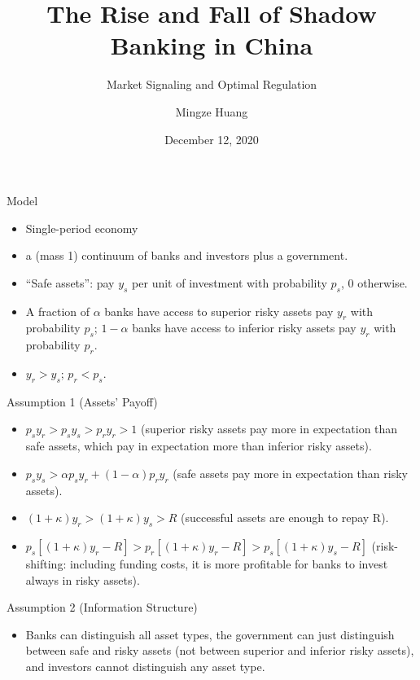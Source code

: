 \documentclass[
  ignorenonframetext,
]{beamer}
\title{The Rise and Fall of Shadow Banking in China}
\subtitle{Market Signaling and Optimal Regulation}
\author{Mingze Huang}
\date{December 12, 2020}
\providecommand{\tightlist}{%
  \setlength{\itemsep}{0pt}\setlength{\parskip}{0pt}}
\begin{document}
\frame{\titlepage}

\begin{frame}{Model}
\protect\hypertarget{model}{}

\begin{itemize}
\item
  Single-period economy
\item
  a (mass 1) continuum of banks and investors plus a government.
\item
  ``Safe assets'': pay \(y_s\) per unit of investment with probability
  \(p_s\), \(0\) otherwise.
\item
  A fraction of \(\alpha\) banks have access to superior risky assets
  pay \(y_{r}\) with probability \(p_{s}\); \(1-\alpha\) banks have
  access to inferior risky assets pay \(y_{r}\) with probability
  \(p_{r}\).
\item
  \(y_{r}>y_{s}\); \(p_{r}<p_{s}\).
\end{itemize}

\end{frame}

\begin{frame}{Assumption 1 (Assets' Payoff)}
\protect\hypertarget{assumption-1-assets-payoff}{}

\begin{itemize}
\item
  \(p_{s}y_{r}>p_{s}y_{s}>p_{r}y_{r}>1\) (superior risky assets pay more
  in expectation than safe assets, which pay in expectation more than
  inferior risky assets).
\item
  \(p_{s}y_{s}>\alpha p_{s}y_{r}+(1-\alpha)p_{r}y_{r}\) (safe assets pay
  more in expectation than risky assets).
\item
  \((1+\kappa)y_{r}>(1+\kappa)y_{s}>R\) (successful assets are enough to
  repay R).
\item
  \(p_{s}[(1+\kappa)y_{r}-R]>p_{r}[(1+\kappa)y_{r}-R]>p_{s}[(1+\kappa)y_{s}-R]\)
  (risk-shifting: including funding costs, it is more profitable for
  banks to invest always in risky assets).
\end{itemize}

\end{frame}

\begin{frame}{Assumption 2 (Information Structure)}
\protect\hypertarget{assumption-2-information-structure}{}

\begin{itemize}
\tightlist
\item
  Banks can distinguish all asset types, the government can just
  distinguish between safe and risky assets (not between superior and
  inferior risky assets), and investors cannot distinguish any asset
  type.
\end{itemize}

\end{frame}
\end{document}

